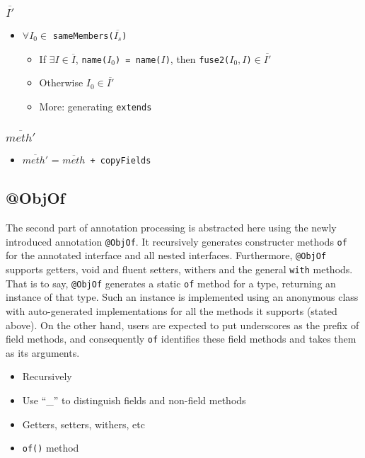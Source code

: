 \subsubsection{$\overline{I'}$}
\begin{itemize}
\item $\forall I_0\in$ \lstinline{sameMembers(}$\overline{I_s}$\lstinline{)}
    \begin{itemize}
    \item If $\exists I\in\overline{I}$, \lstinline{name(}$I_0$\lstinline{) = name(}$I$\lstinline{)}, then \lstinline{fuse2(}$I_0,I$\lstinline{)}$\in\overline{I'}$
    \item Otherwise $I_0\in\overline{I'}$
    \item More: generating \lstinline{extends}
    \end{itemize}
\end{itemize}

\subsubsection{$\overline{meth'}$}
\begin{itemize}
\item $\overline{meth'}$ = $\overline{meth}$\lstinline{ + copyFields}
\end{itemize}

\subsection{@ObjOf}
The second part of annotation processing is abstracted here using the newly introduced annotation
\lstinline{@ObjOf}. It recursively generates constructer methods \lstinline{of} for the annotated interface
and all nested interfaces. Furthermore, \lstinline{@ObjOf} supports getters, void and fluent setters, withers and
the general \lstinline{with} methods. That is to say, \lstinline{@ObjOf} generates a static \lstinline{of} method
for a type, returning an instance of that type. Such an instance is implemented using an anonymous class with auto-generated
implementations for all the methods it supports (stated above). On the other hand, users are expected to put underscores as the
prefix of field methods, and consequently \lstinline{of} identifies these field methods and takes them as its arguments.

\begin{itemize}
\item Recursively
\item Use ``\_'' to distinguish fields and non-field methods
\item Getters, setters, withers, etc
\item \lstinline{of()} method
\end{itemize}